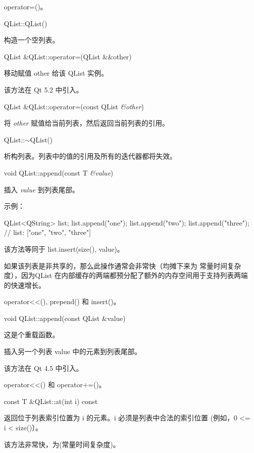 \begin{seeAlso}
operator=()。
\end{seeAlso}

QList::QList()

构造一个空列表。

QList \&QList::operator=(QList \&\&other)

移动赋值 other 给该 QList 实例。

该方法在 Qt 5.2 中引入。

QList \&QList::operator=(const QList \emph{\&other})

将 \emph{other} 赋值给当前列表，然后返回当前列表的引用。

QList::$\sim$QList()

析构列表。列表中的值的引用及所有的迭代器都将失效。

void QList::append(const T \emph{\&value})

插入 \emph{value} 到列表尾部。

示例：

\begin{cppcode}
QList<QString> list;
list.append("one");
list.append("two");
list.append("three");
// list: ["one", "two", "three"]
\end{cppcode}

该方法等同于 list.insert(size(), value)。

如果该列表是非共享的，那么此操作通常会非常快（均摊下来为 常量时间复杂度），因为QList 在内部缓存的两端都预分配了额外的内存空间用于支持列表两端的快速增长。




\begin{seeAlso}
operator<<(), prepend() 和 insert()。
\end{seeAlso}



void QList::append(const QList \&value)

这是个重载函数。

插入另一个列表 value 中的元素到列表尾部。

该方法在 Qt 4.5 中引入。

\begin{seeAlso}
 operator<<() 和 operator+=()。
\end{seeAlso}


const T \&QList::at(int i) const

返回位于列表索引位置为 i 的元素。i 必须是列表中合法的索引位置 (例如，0 <= i < size()）。

该方法非常快，为(常量时间复杂度)。


